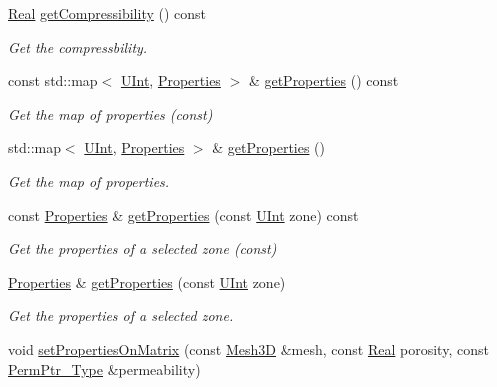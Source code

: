 \begin{DoxyCompactItemize}
\hyperlink{namespaceFVCode3D_a40c1f5588a248569d80aa5f867080e83}{Real} \hyperlink{classFVCode3D_1_1PropertiesMap_a45a68e2cdccdb1ff98878278f7dca42f}{get\+Compressibility} () const 
\begin{DoxyCompactList}\small\item\em Get the compressbility. \end{DoxyCompactList}\item 
const std\+::map$<$ \hyperlink{namespaceFVCode3D_a4bf7e328c75d0fd504050d040ebe9eda}{U\+Int}, \hyperlink{classFVCode3D_1_1Properties}{Properties} $>$ \& \hyperlink{classFVCode3D_1_1PropertiesMap_ace888d15c9a4ab13d5e217a3a565604c}{get\+Properties} () const 
\begin{DoxyCompactList}\small\item\em Get the map of properties (const) \end{DoxyCompactList}\item 
std\+::map$<$ \hyperlink{namespaceFVCode3D_a4bf7e328c75d0fd504050d040ebe9eda}{U\+Int}, \hyperlink{classFVCode3D_1_1Properties}{Properties} $>$ \& \hyperlink{classFVCode3D_1_1PropertiesMap_ac6aa90932a7ea39d68401d31f9655f2d}{get\+Properties} ()
\begin{DoxyCompactList}\small\item\em Get the map of properties. \end{DoxyCompactList}\item 
const \hyperlink{classFVCode3D_1_1Properties}{Properties} \& \hyperlink{classFVCode3D_1_1PropertiesMap_ab06f08f098ebe4cac0dfb78ca1a3fd7f}{get\+Properties} (const \hyperlink{namespaceFVCode3D_a4bf7e328c75d0fd504050d040ebe9eda}{U\+Int} zone) const 
\begin{DoxyCompactList}\small\item\em Get the properties of a selected zone (const) \end{DoxyCompactList}\item 
\hyperlink{classFVCode3D_1_1Properties}{Properties} \& \hyperlink{classFVCode3D_1_1PropertiesMap_a85d23b6c8da4de58e30bab6ad643c084}{get\+Properties} (const \hyperlink{namespaceFVCode3D_a4bf7e328c75d0fd504050d040ebe9eda}{U\+Int} zone)
\begin{DoxyCompactList}\small\item\em Get the properties of a selected zone. \end{DoxyCompactList}\item 
void \hyperlink{classFVCode3D_1_1PropertiesMap_ad5f9cccc9355b9af66025f6c433b8997}{set\+Properties\+On\+Matrix} (const \hyperlink{classFVCode3D_1_1Mesh3D}{Mesh3D} \&mesh, const \hyperlink{namespaceFVCode3D_a40c1f5588a248569d80aa5f867080e83}{Real} porosity, const \hyperlink{namespaceFVCode3D_aee5ae48a57366603109f90f526a645b1}{Perm\+Ptr\+\_\+\+Type} \&permeability)

\end{DoxyCompactItemize}
